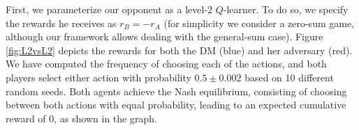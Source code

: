 First, we parameterize our opponent as a level-2 $Q$-learner.
To do so, we specify the rewards he receives as $r_B = -r_A$
(for simplicity we consider a zero-sum game, although our framework allows dealing with the general-sum case). Figure \ref{fig:L2vsL2} depicts the rewards for both the DM (blue)
and her adversary (red). We have computed the frequency of choosing each of the actions, and both players select either action 
with probability $0.5 \pm 0.002$ based on 10 different random seeds. Both agents achieve the Nash equilibrium, consisting of
choosing between both
actions with equal probability, leading to an expected cumulative reward of 0, as shown in the graph.

\begin{figure}%
\centering
{}%
  
  

\end{figure}

